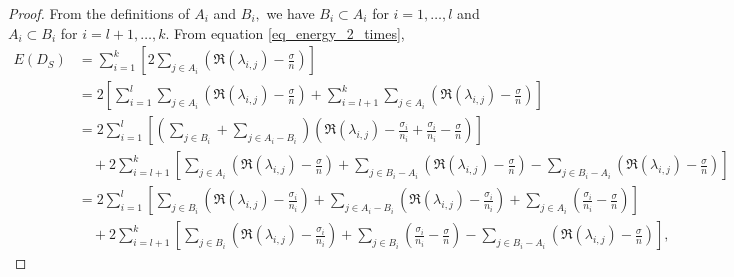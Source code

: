 \documentclass[12pt,a4paper,reqno]{amsart}
\numberwithin{equation}{section}
\theoremstyle{plain}
\theoremstyle{definition}
\newcommand{\<}{\langle}
\renewcommand{\>}{\rangle}
\begin{document}
\begin{proof}
	From the definitions of $A_i$ and $B_i,$ we have $B_i \subset A_i$ for $i=1,\ldots,l$ and $A_i \subset B_i$ for $i=l+1, \ldots, k$.
	From equation \eqref{eq_energy_2_times},
	\begin{align*}
	E(D_S)
	&= \sum_{i=1}^k \left[ 2\sum_{j\in A_i} \left( \Re(\lambda_{i,j})-\frac{\sigma}{n} \right) \right]\\
	&= 2\left[\sum_{i=1}^l  \sum_{j\in A_i} \left( \Re(\lambda_{i,j})-\frac{\sigma}{n} \right)  + \sum_{i=l+1}^k  \sum_{j\in A_i} \left( \Re(\lambda_{i,j})-\frac{\sigma}{n} \right) \right]\\
	&= 2 \sum_{i=1}^l  \left[  \left(\sum_{j\in B_i} + \sum_{j\in A_i-B_i}  \right) \left( \Re(\lambda_{i,j}) -\frac{\sigma_i}{n_i} +\frac{\sigma_i}{n_i}-\frac{\sigma}{n} \right) \right] \\
	&\quad + 2\sum_{i=l+1}^k \left[ \sum_{j\in A_i} \left( \Re(\lambda_{i,j})-\frac{\sigma}{n} \right) 
	+\sum_{j\in B_i-A_i} \left( \Re(\lambda_{i,j})-\frac{\sigma}{n} \right)-\sum_{j\in B_i-A_i} \left( \Re(\lambda_{i,j})-\frac{\sigma}{n} \right)\right] \\
	&= 2\sum_{i=1}^l \left[  \sum_{j\in B_i} \left( \Re(\lambda_{i,j}) -\frac{\sigma_i}{n_i}\right) + \sum_{j\in A_i-B_i} \left( \Re(\lambda_{i,j}) -\frac{\sigma_i}{n_i} \right)  + \sum_{j\in A_i} \left( \frac{\sigma_i}{n_i}-\frac{\sigma}{n} \right)   \right]\\
	&\quad+ 2\sum_{i=l+1}^k \left[ \sum_{j\in B_i} \left( \Re(\lambda_{i,j})-\frac{\sigma_i}{n_i} \right) + \sum_{j\in B_i} \left( \frac{\sigma_i}{n_i}-\frac{\sigma}{n} \right)-\sum_{j\in B_i-A_i} \left( \Re(\lambda_{i,j})-\frac{\sigma}{n} \right)  \right],
	\end{align*}


\end{proof}
\end{document}
